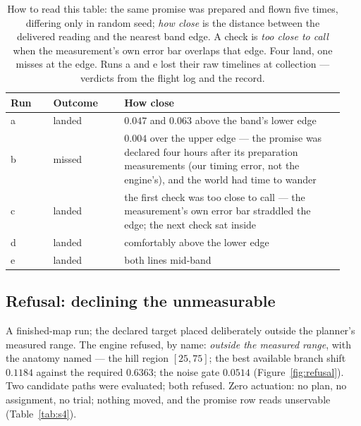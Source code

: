 \documentclass[11pt,a4paper]{article}
\begin{document}
\begin{table}[!ht]
\centering
\small
\begin{tabular}{@{}p{0.12\linewidth}p{0.20\linewidth}p{0.62\linewidth}@{}}
\toprule
\textbf{Run} & \textbf{Outcome} & \textbf{How close} \\
\midrule
a & landed & $0.047$ and $0.063$ above the band's lower edge \\
b & missed & $0.004$ over the upper edge --- the promise was declared
four hours after its preparation measurements (our timing error, not
the engine's), and the world had time to wander \\
c & landed & the first check was too close to call --- the
measurement's own error bar straddled the edge; the next check sat
inside \\
d & landed & comfortably above the lower edge \\
e & landed & both lines mid-band \\
\bottomrule
\end{tabular}
\caption{How to read this table: the same promise was prepared and
flown five times, differing only in random seed; \emph{how close}
is the distance between the delivered reading and the nearest band
edge. A check is \emph{too close to call} when the measurement's
own error bar overlaps that edge. Four land, one misses at the
edge. Runs a and e lost their raw timelines at collection ---
verdicts from the flight log and the record.}
\label{tab:s2}
\end{table}

\subsection{Refusal: declining the unmeasurable}
\label{sec:refusal}

A finished-map run; the declared target placed deliberately outside
the planner's measured range. The engine refused, by name:
\emph{outside the measured range}, with the anatomy named --- the
hill region $[25,75]$; the best available branch shift $0.1184$
against the required $0.6363$; the noise gate $0.0514$
(Figure~\ref{fig:refusal}). Two candidate
paths were evaluated; both refused. Zero actuation: no plan, no
assignment, no trial; nothing moved, and the promise row reads
unservable (Table~\ref{tab:s4}).
\end{document}
